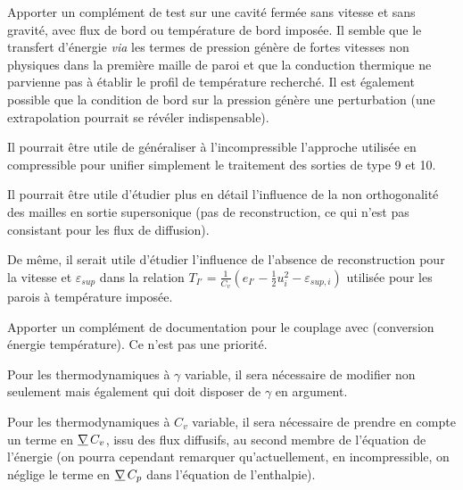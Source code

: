 Apporter un complément de test sur une cavité fermée
sans vitesse et sans gravité, avec flux de bord ou température de bord imposée.
Il semble que le transfert d'énergie {\it via} les termes de pression génère de
fortes vitesses non physiques dans la première maille de paroi et que la
conduction thermique ne parvienne pas à établir le profil de température
recherché. Il est également possible que la condition de bord sur la pression
génère une perturbation (une extrapolation pourrait se révéler
indispensable).

Il pourrait être utile de généraliser à l'incompressible l'approche
utilisée en compressible pour unifier simplement le traitement
des sorties de type 9 et 10.

Il pourrait être utile d'étudier plus en détail l'influence de la non
orthogonalité des mailles en sortie supersonique (pas de reconstruction,
ce qui n'est pas consistant pour les flux de diffusion).

De même, il serait utile d'étudier l'influence de l'absence de
reconstruction pour la vitesse et $\varepsilon_{sup}$ dans la relation
$\displaystyle T_{I'}=\frac{1}{C_v}\left(e_{I'}-\frac{1}{2}u^2_{i}-\varepsilon_{sup,i}\right)$
utilisée pour les parois à température imposée.

Apporter un complément de documentation pour le couplage avec \syrthes (conversion
énergie température). Ce n'est pas une priorité.

Pour les thermodynamiques à $\gamma$ variable, il sera nécessaire de
modifier non
seulement  mais également  qui doit disposer de
$\gamma$ en argument.

Pour les thermodynamiques à $C_v$ variable, il sera nécessaire de
prendre en compte un terme en $\underline{\nabla}\,C_v$, issu des flux diffusifs,
au second membre de l'équation de
l'énergie (on pourra cependant remarquer qu'actuellement, en incompressible,
on néglige le terme en $\underline{\nabla}\,C_p$ dans l'équation de l'enthalpie).
